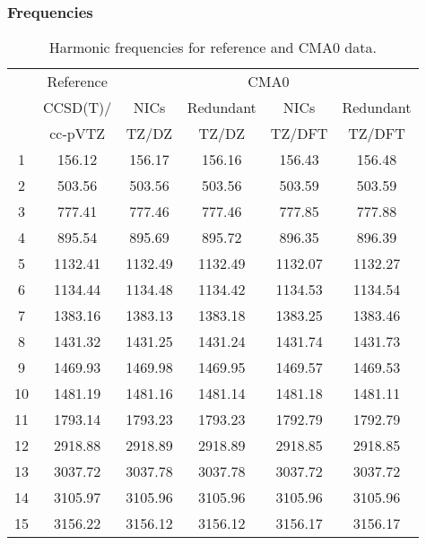 \documentclass[10pt,oneside]{article}
\begin{document}
\begin{table}[h!]
\subsubsection*{Frequencies}
\centering
\caption{Harmonic frequencies for reference and CMA0 data.}
\begin{tabular}{cccccc}
\toprule
{} & Reference & \multicolumn{4}{c}{CMA0} \\
{} &  CCSD(T)/ &    NICs &  Redundant &    NICs & Redundant \\
{} &   cc-pVTZ &   TZ/DZ &      TZ/DZ &  TZ/DFT &    TZ/DFT \\
\midrule
1  &    156.12 &  156.17 &     156.16 &  156.43 &    156.48 \\
2  &    503.56 &  503.56 &     503.56 &  503.59 &    503.59 \\
3  &    777.41 &  777.46 &     777.46 &  777.85 &    777.88 \\
4  &    895.54 &  895.69 &     895.72 &  896.35 &    896.39 \\
5  &   1132.41 & 1132.49 &    1132.49 & 1132.07 &   1132.27 \\
6  &   1134.44 & 1134.48 &    1134.42 & 1134.53 &   1134.54 \\
7  &   1383.16 & 1383.13 &    1383.18 & 1383.25 &   1383.46 \\
8  &   1431.32 & 1431.25 &    1431.24 & 1431.74 &   1431.73 \\
9  &   1469.93 & 1469.98 &    1469.95 & 1469.57 &   1469.53 \\
10 &   1481.19 & 1481.16 &    1481.14 & 1481.18 &   1481.11 \\
11 &   1793.14 & 1793.23 &    1793.23 & 1792.79 &   1792.79 \\
12 &   2918.88 & 2918.89 &    2918.89 & 2918.85 &   2918.85 \\
13 &   3037.72 & 3037.78 &    3037.78 & 3037.72 &   3037.72 \\
14 &   3105.97 & 3105.96 &    3105.96 & 3105.96 &   3105.96 \\
15 &   3156.22 & 3156.12 &    3156.12 & 3156.17 &   3156.17 \\
\bottomrule
\end{tabular}
\end{table}
\end{document}
